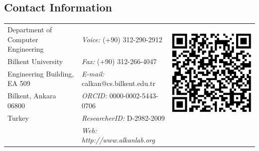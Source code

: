 \documentclass[margin,line]{res}
\begin{document}

\begin{resume}

  \section{\sc Contact Information}
  \vspace{.05in}
  \begin{tabular}{@{}p{2.5in}p{2.3in}p{1in}}
    Department of Computer Engineering & {\it Voice:}  (+90) 312-290-2912 & \multirow{5}{*}{\includegraphics[scale=0.15]{calkan_orcid.png}}\\            
    Bilkent University   & {\it Fax:}    (+90) 312-266-4047 & \\         
    Engineering Building, EA 509   & {\it E-mail:}  calkan@cs.bilkent.edu.tr &\\        %
    Bilkent, Ankara 06800 & {\it ORCID: } 0000-0002-5443-0706 &\\ 
    Turkey & {\it ResearcherID: } D-2982-2009 &\\ 
    & {\it Web: http://www.alkanlab.org} & \\
  \end{tabular}
  

\end{resume}
\end{document}

